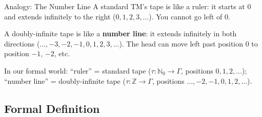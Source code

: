 \documentclass[11pt,a4paper]{article}
\begin{document}
\begin{notebox}{Analogy: The Number Line}
A standard TM's tape is like a ruler: it starts at 0 and extends infinitely to the right ($0, 1, 2, 3, \ldots$). You cannot go left of 0.

A doubly-infinite tape is like a \textbf{number line}: it extends infinitely in both directions ($\ldots, -3, -2, -1, 0, 1, 2, 3, \ldots$). The head can move left past position 0 to position $-1$, $-2$, etc.

In our formal world: ``ruler'' = standard tape ($\tau: \mathbb{N}_0 \to \Gamma$, positions $0, 1, 2, \ldots$); ``number line'' = doubly-infinite tape ($\tau: \mathbb{Z} \to \Gamma$, positions $\ldots, -2, -1, 0, 1, 2, \ldots$).
\end{notebox}

\subsection{Formal Definition}
\end{document}
